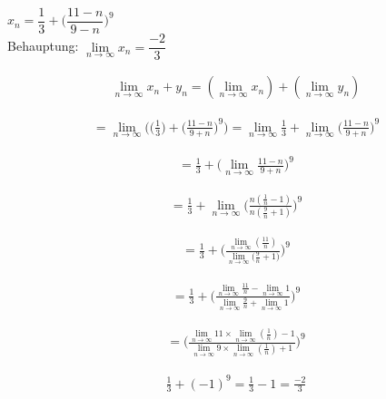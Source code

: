 \begin{example}
	$x_n = \dfrac{1}{3} + \big(\dfrac{11-n}{9-n}\big)^9$\\
	Behauptung: $\lim\limits_{n \rightarrow \infty}{x_n}=\dfrac{-2}{3}$
	
	\newpage
	\begin{lemma}
		\begin{gather}
		\lim\limits_{n \rightarrow \infty}{x_n+y_n}=
		(\lim\limits_{n \rightarrow \infty}{x_n}) +
		(\lim\limits_{n \rightarrow \infty}{y_n})
		\end{gather}
	\end{lemma}
	
	\begin{gather}
	=\lim\limits_{n \rightarrow \infty}{\bigg(\big(\frac{1}{3}\big)+\bigg(\frac{11-n}{9+n}\bigg)^9\bigg)}
	= \lim\limits_{n \rightarrow \infty}{\frac{1}{3}+
		\lim\limits_{n \rightarrow \infty}{\bigg(\frac{11-n}{9+n}\bigg)^9}}
	\end{gather}
	
	\begin{gather}
	= \frac{1}{3} + \bigg(\lim\limits_{n \rightarrow \infty}{\frac{11-n}{9+n}}\bigg)^9
	\end{gather}
	
	
	\begin{gather}
	= \frac{1}{3} + \lim\limits_{n \rightarrow \infty}{\Bigg(\frac{n(\frac{1}{n}-1)}{n(\frac{9}{n}+1)}\Bigg)^9}
	\end{gather}
	
	\begin{gather}
	= \frac{1}{3}+\Bigg(\frac{\lim\limits_{n \rightarrow \infty}{(\frac{11}{n})}}{\lim\limits_{n \rightarrow \infty}{(\frac{9}{n}+1})}\Bigg)^9
	\end{gather}
	
	\begin{gather}
	= \frac{1}{3} + \Bigg(
	\frac{\lim\limits_{n \rightarrow \infty}{\frac{11}{n}} - \lim\limits_{n \rightarrow \infty}{1}}{\lim\limits_{n \rightarrow \infty}{\frac{9}{n}+\lim\limits_{n \rightarrow \infty}{1} } }   \Bigg)^9
	\end{gather}
	
	
	\begin{gather}
	=\Bigg(
	\frac{\lim\limits_{n \rightarrow \infty}{11} \times \lim\limits_{n \rightarrow \infty}{(\frac{1}{n})-1}}{\lim\limits_{n \rightarrow \infty}{9 \times \lim\limits_{n \rightarrow \infty}{(\frac{1}{n})+1} } }   \Bigg)^9
	\end{gather}
	
	\begin{gather}
	\frac{1}{3}+(-1)^9 = \frac{1}{3}-1 = \frac{-2}{3}
	\end{gather}
\end{example}

